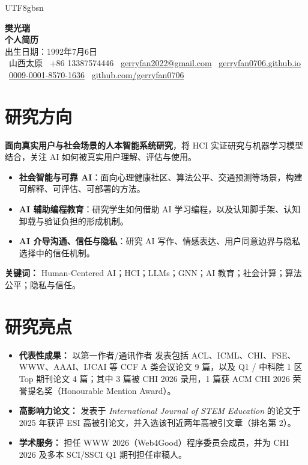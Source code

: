 \documentclass[a4paper,10pt]{article}
\newcommand{\cvlabel}[1]{\textbf{#1}}
\begin{document}
\ifPDFTeX
\begin{CJK*}{UTF8}{gbsn}
\fi

\pagestyle{empty}

\begin{center}
    \textbf{\LARGE 樊光瑞}\\[5pt]
    \textbf{\large 个人简历}\\[3pt]
    出生日期：1992年7月6日\\[2pt]
    \faMapMarker*~山西太原 \quad
    \faPhone~+86 13387574446 \quad
    \faEnvelope~\href{mailto:gerryfan2022@gmail.com}{gerryfan2022@gmail.com} \quad
    \faGlobe~\href{https://gerryfan0706.github.io}{gerryfan0706.github.io}\\[2pt]
    \faOrcid~\href{https://orcid.org/0009-0001-8570-1636}{0009-0001-8570-1636} \quad
    \faGithub~\href{https://github.com/gerryfan0706}{github.com/gerryfan0706}
\end{center}

\section*{研究方向}

\cvlabel{面向真实用户与社会场景的人本智能系统研究}，将 HCI 实证研究与机器学习模型结合，关注 AI 如何被真实用户理解、评估与使用。
\begin{itemize}[leftmargin=*]
  \item \cvlabel{社会智能与可靠 AI}：面向心理健康社区、算法公平、交通预测等场景，构建可解释、可评估、可部署的方法。
  \item \cvlabel{AI 辅助编程教育}：研究学生如何借助 AI 学习编程，以及认知脚手架、认知卸载与验证负担的形成机制。
  \item \cvlabel{AI 介导沟通、信任与隐私}：研究 AI 写作、情感表达、用户同意边界与隐私选择中的信任机制。
\end{itemize}
\noindent\cvlabel{关键词：} Human-Centered AI；HCI；LLMs；GNN；AI 教育；社会计算；算法公平；隐私与信任。

\section*{研究亮点}
\begin{itemize}[leftmargin=*]
    \item \cvlabel{代表性成果：} 以第一作者/通讯作者 发表包括 ACL、ICML、CHI、FSE、WWW、AAAI、IJCAI 等 CCF A 类会议论文 9 篇，以及 Q1 / 中科院 1 区 Top 期刊论文 4 篇；其中 3 篇被 CHI 2026 录用，1 篇获 ACM CHI 2026 荣誉提名奖（Honourable Mention Award）。
    \item \cvlabel{高影响力论文：} 发表于 \textit{International Journal of STEM Education} 的论文于 2025 年获评 ESI 高被引论文，并入选该刊近两年高被引文章（排名第 2）。
    \item \cvlabel{学术服务：} 担任 WWW 2026（Web4Good）程序委员会成员，并为 CHI 2026 及多本 SCI/SSCI Q1 期刊担任审稿人。
\end{itemize}


\end{CJK*}
\end{document}
